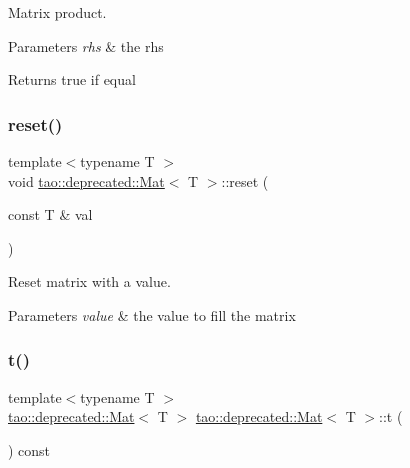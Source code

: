 Matrix product. 


\begin{DoxyParams}{Parameters}
{\em rhs} & the rhs \\
\hline
\end{DoxyParams}
\begin{DoxyReturn}{Returns}
true if equal 
\end{DoxyReturn}
\mbox{\label{classtao_1_1deprecated_1_1_mat_a77c9519c2b0c652d12fedbe5adc2eaf7}} 
\subsubsection{\texorpdfstring{reset()}{reset()}}
{\footnotesize\ttfamily template$<$typename T $>$ \\
void \mbox{\hyperlink{classtao_1_1deprecated_1_1_mat}{tao\+::deprecated\+::\+Mat}}$<$ T $>$\+::reset (\begin{DoxyParamCaption}\item[{const T \&}]{val }\end{DoxyParamCaption})}



Reset matrix with a value. 


\begin{DoxyParams}{Parameters}
{\em value} & the value to fill the matrix \\
\hline
\end{DoxyParams}
\mbox{\label{classtao_1_1deprecated_1_1_mat_adc5956023d0193046831eab0f05aeacd}} 
\subsubsection{\texorpdfstring{t()}{t()}}
{\footnotesize\ttfamily template$<$typename T $>$ \\
\mbox{\hyperlink{classtao_1_1deprecated_1_1_mat}{tao\+::deprecated\+::\+Mat}}$<$ T $>$ \mbox{\hyperlink{classtao_1_1deprecated_1_1_mat}{tao\+::deprecated\+::\+Mat}}$<$ T $>$\+::t (\begin{DoxyParamCaption}{ }\end{DoxyParamCaption}) const}



